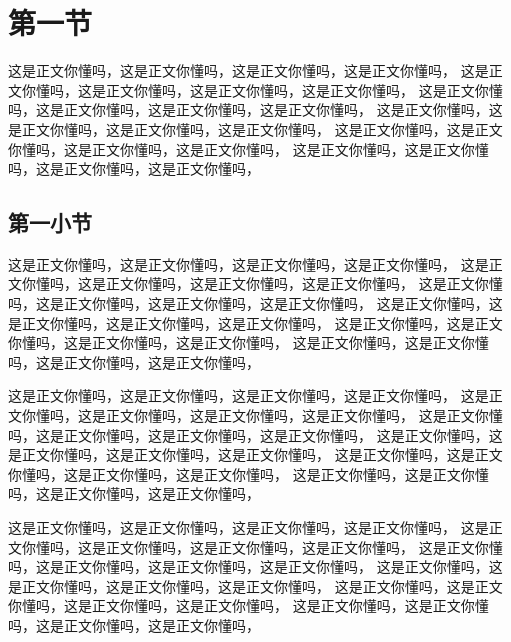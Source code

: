 \documentclass[11pt,a4paper]{article}
\begin{document}
\section{第一节}

这是正文你懂吗，这是正文你懂吗，这是正文你懂吗，这是正文你懂吗，
这是正文你懂吗，这是正文你懂吗，这是正文你懂吗，这是正文你懂吗，
这是正文你懂吗，这是正文你懂吗，这是正文你懂吗，这是正文你懂吗，
这是正文你懂吗，这是正文你懂吗，这是正文你懂吗，这是正文你懂吗，
这是正文你懂吗，这是正文你懂吗，这是正文你懂吗，这是正文你懂吗，
这是正文你懂吗，这是正文你懂吗，这是正文你懂吗，这是正文你懂吗，

\subsection{第一小节}

这是正文你懂吗，这是正文你懂吗，这是正文你懂吗，这是正文你懂吗，
这是正文你懂吗，这是正文你懂吗，这是正文你懂吗，这是正文你懂吗，
这是正文你懂吗，这是正文你懂吗，这是正文你懂吗，这是正文你懂吗，
这是正文你懂吗，这是正文你懂吗，这是正文你懂吗，这是正文你懂吗，
这是正文你懂吗，这是正文你懂吗，这是正文你懂吗，这是正文你懂吗，
这是正文你懂吗，这是正文你懂吗，这是正文你懂吗，这是正文你懂吗，

这是正文你懂吗，这是正文你懂吗，这是正文你懂吗，这是正文你懂吗，
这是正文你懂吗，这是正文你懂吗，这是正文你懂吗，这是正文你懂吗，
这是正文你懂吗，这是正文你懂吗，这是正文你懂吗，这是正文你懂吗，
这是正文你懂吗，这是正文你懂吗，这是正文你懂吗，这是正文你懂吗，
这是正文你懂吗，这是正文你懂吗，这是正文你懂吗，这是正文你懂吗，
这是正文你懂吗，这是正文你懂吗，这是正文你懂吗，这是正文你懂吗，

这是正文你懂吗，这是正文你懂吗，这是正文你懂吗，这是正文你懂吗，
这是正文你懂吗，这是正文你懂吗，这是正文你懂吗，这是正文你懂吗，
这是正文你懂吗，这是正文你懂吗，这是正文你懂吗，这是正文你懂吗，
这是正文你懂吗，这是正文你懂吗，这是正文你懂吗，这是正文你懂吗，
这是正文你懂吗，这是正文你懂吗，这是正文你懂吗，这是正文你懂吗，
这是正文你懂吗，这是正文你懂吗，这是正文你懂吗，这是正文你懂吗，
\end{document}
